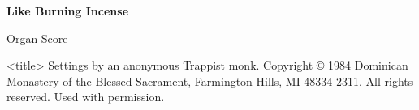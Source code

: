 \documentclass{lbi_organ_bind}
\begin{document}
\thispagestyle{empty}

\begin{center}
    \null\vfill
    \huge\bfseries
    Like Burning Incense

    \normalfont\huge
    \vspace{2\baselineskip}Organ Score

    \vspace{1\baselineskip}<title>
    \vfill\vfill\vfill
    \small
    Settings by an anonymous Trappist monk. Copyright © 1984 Dominican Monastery of the Blessed Sacrament, Farmington Hills, MI 48334-2311. All rights reserved. Used with permission.
\end{center}

\newpage



\newpage\null\newpage


\end{document}
